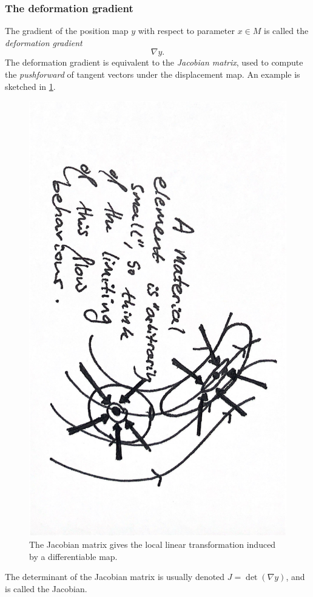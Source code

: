 \subsubsection{The deformation gradient}
The gradient of the position map $y$ with respect to parameter $x \in M$ is called the \textit{deformation gradient}
\begin{equation}\label{deformation_gradient}
    \nabla y.
\end{equation}
The deformation gradient is equivalent to the \textit{Jacobian matrix}, used to compute the \textit{pushforward}
of tangent vectors under the displacement map. An example is sketched in \ref{sketch_jacobian}.
\begin{figure}[H]
\centerline{\includegraphics[angle=90,page=4,width=0.5\linewidth]{figures/2.pdf}}
\caption{\small
    The Jacobian matrix gives the local linear transformation induced by a differentiable map.
}
\label{sketch_jacobian}
\end{figure}
The determinant of the Jacobian matrix is usually denoted $J = \det(\nabla y)$, and is called the Jacobian.

